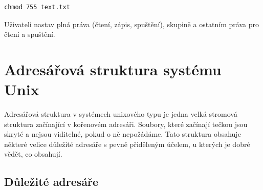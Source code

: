 \documentclass{article}
\begin{document}
\begin{verbatim}
chmod 755 text.txt
\end{verbatim}
Uživateli nastav plná práva (čtení, zápis, spuštění), skupině a ostatním práva pro čtení a spuštění.

\section{Adresářová struktura systému Unix}
Adresářová struktura v systémech unixového typu je jedna velká stromová struktura začínající v kořenovém adresáři. Soubory, které začínají tečkou jsou skryté a nejsou viditelné, pokud o ně nepožádáme. Tato struktura obsahuje některé velice důležité adresáře s pevně přiděleným účelem, u kterých je dobré vědět, co obsahují.

\subsection{Důležité adresáře}
\end{document}
